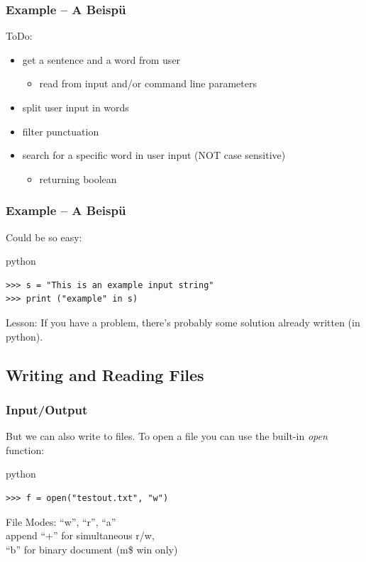 \documentclass{beamer}
\begin{document}
\begin{frame}[fragile]
	\frametitle{Example -- A Beispü}
	
	ToDo:
	\begin{itemize}
	\item get a sentence and a word from user
		\begin{itemize}
		\item read from input and/or command line parameters
		\end{itemize}
	\item split user input in words
	\item filter punctuation
	\item search for a specific word in user input (NOT case sensitive)
		\begin{itemize}
		\item returning boolean
		\end{itemize}
	\end{itemize}
\end{frame}

\begin{frame}[fragile]
	\frametitle{Example -- A Beispü}
	
	Could be so easy:
\pause
	\begin{exampleblock}{python}
	\begin{lstlisting}
>>> s = "This is an example input string"
>>> print ("example" in s)
	\end{lstlisting}
	\end{exampleblock}
\pause
	\begin{block}{Lesson:}
	If you have a problem, there's probably some solution already written (in python).
	\end{block}
\end{frame}

\subsection{Writing and Reading Files}

\begin{frame}[fragile]
	\frametitle{Input/Output}

	But we can also write to files. To open a file you can use the built-in \emph{open} function:
	\begin{exampleblock}{python}
	\begin{lstlisting}
>>> f = open("testout.txt", "w")
	\end{lstlisting}
	\end{exampleblock}
\pause
	File Modes: ``w'', ``r'', ``a''\\
	append ``+'' for simultaneous r/w, \\
	``b'' for binary document (m\$ win only)
\end{frame}
\end{document}
